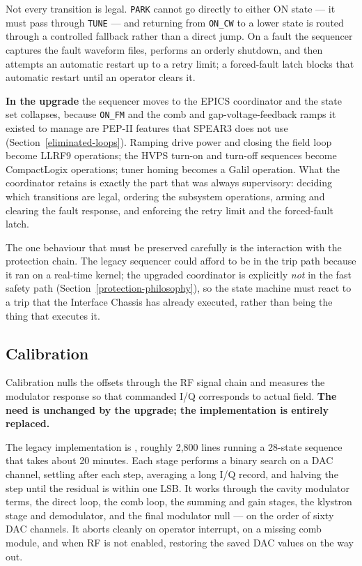 Not every transition is legal. \texttt{PARK} cannot go directly to either ON state --- it must pass through \texttt{TUNE} --- and returning from \texttt{ON\_CW} to a lower state is routed through a controlled fallback rather than a direct jump. On a fault the sequencer captures the fault waveform files, performs an orderly shutdown, and then attempts an automatic restart up to a retry limit; a forced-fault latch blocks that automatic restart until an operator clears it.

\textbf{In the upgrade} the sequencer moves to the EPICS coordinator and the state set collapses, because \texttt{ON\_FM} and the comb and gap-voltage-feedback ramps it existed to manage are PEP-II features that SPEAR3 does not use (Section~\ref{eliminated-loops}). Ramping drive power and closing the field loop become LLRF9 operations; the HVPS turn-on and turn-off sequences become CompactLogix operations; tuner homing becomes a Galil operation. What the coordinator retains is exactly the part that was always supervisory: deciding which transitions are legal, ordering the subsystem operations, arming and clearing the fault response, and enforcing the retry limit and the forced-fault latch.

The one behaviour that must be preserved carefully is the interaction with the protection chain. The legacy sequencer could afford to be in the trip path because it ran on a real-time kernel; the upgraded coordinator is explicitly \emph{not} in the fast safety path (Section~\ref{protection-philosophy}), so the state machine must react to a trip that the Interface Chassis has already executed, rather than being the thing that executes it.

\subsection{Calibration}\label{calibration}

Calibration nulls the offsets through the RF signal chain and measures the modulator response so that commanded I/Q corresponds to actual field. \textbf{The need is unchanged by the upgrade; the implementation is entirely replaced.}

The legacy implementation is , roughly 2,800 lines running a 28-state sequence that takes about 20 minutes. Each stage performs a binary search on a DAC channel, settling after each step, averaging a long I/Q record, and halving the step until the residual is within one LSB. It works through the cavity modulator terms, the direct loop, the comb loop, the summing and gain stages, the klystron stage and demodulator, and the final modulator null --- on the order of sixty DAC channels. It aborts cleanly on operator interrupt, on a missing comb module, and when RF is not enabled, restoring the saved DAC values on the way out.

